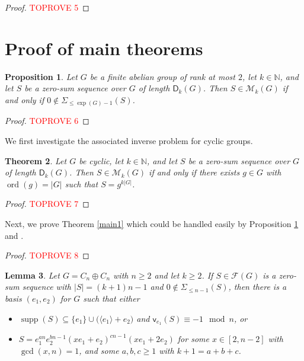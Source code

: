 \documentclass[11pt]{amsart}
\newtheorem{theorem}{Theorem}[section]
\newtheorem{lemma}[theorem]{Lemma}
\newtheorem{proposition}[theorem]{Proposition}
\theoremstyle{definition}
\newcommand{\N}{\mathbb N}
\DeclareMathOperator{\ord}{ord}
\DeclareMathOperator{\supp}{supp}
\newcommand{\la}{\langle}
\newcommand{\ra}{\rangle}
\newcommand{\vp}{\mathsf v}
\numberwithin{equation}{section}
\begin{document}
 \begin{proof}\textcolor{red}{TOPROVE 5}\end{proof}


 




\section{Proof of main theorems}\label{sec-k=n-1}



\begin{proposition}\label{pr-key}
	Let $G$ be a finite abelian group of rank at most $2$, let $k\in \N$, and let $S$ be a zero-sum sequence over $G$ of length $\mathsf D_k(G)$. Then $S\in \mathcal M_k(G)$ if and only if $0\not\in \Sigma_{\le \exp(G)-1}(S)$.
\end{proposition}
\begin{proof}\textcolor{red}{TOPROVE 6}\end{proof}

We first investigate the associated inverse problem  for cyclic groups.

\begin{theorem}\label{le-cyclic}
	Let $G$ be cyclic, let $k\in \N$, and let $S$ be a zero-sum sequence over $G$ of length $\mathsf D_k(G)$. Then $S\in \mathcal M_k(G)$ if and only if there exists $g\in G$ with $\ord(g)=|G|$ such that $S=g^{k|G|}$.
\end{theorem}
\begin{proof}\textcolor{red}{TOPROVE 7}\end{proof}


Next, we prove Theorem \ref{main1}
 which could be handled easily by  Proposition \ref{pr-key} and \cite[Theorem 7.1]{Gao-Ger-propB}.
\begin{proof}\textcolor{red}{TOPROVE 8}\end{proof} 





\begin{lemma}\label{le-key}  Let $G=C_n\oplus C_n$ with $n\ge 2$ and let $k\ge 2$. If  $S\in\mathcal F(G)$  is a zero-sum sequence with $|S|=(k+1)n-1$ and $0\notin \Sigma_{\leq n-1}(S)$, then  there is a basis $(e_1,e_2)$ for $G$ such that either
	\begin{itemize}
		\item[1.] $\supp(S)\subseteq \{e_1\}\cup \big(\la e_1\ra+e_2\big)$ and $\vp_{e_1}(S)\equiv -1\mod n$, or
		\item[2.] $S=e_1^{an} e_2^{bn-1} (xe_1+e_2)^{cn-1}  (xe_1+2e_2)$ for some $x\in [2,n-2]$ with $\gcd(x,n)=1$, and some  $a,b,c\geq 1$ with $k+1=a+b+c$.
	\end{itemize}
\end{lemma}
\end{document}
